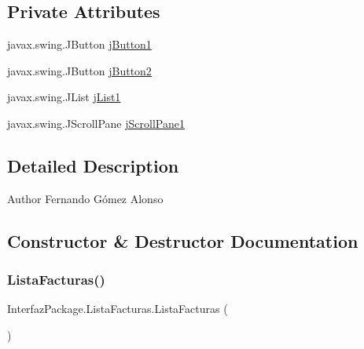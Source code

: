 \subsection*{Private Attributes}
\begin{DoxyCompactItemize}
\item 
javax.\+swing.\+J\+Button \mbox{\hyperlink{class_interfaz_package_1_1_lista_facturas_af1f1a335b42683dc72b7096d9c5612b5}{j\+Button1}}
\item 
javax.\+swing.\+J\+Button \mbox{\hyperlink{class_interfaz_package_1_1_lista_facturas_a099e7867e628d252ed807ea6bd95dea1}{j\+Button2}}
\item 
javax.\+swing.\+J\+List \mbox{\hyperlink{class_interfaz_package_1_1_lista_facturas_a92c3e7b820b65782c261920bbc6af073}{j\+List1}}
\item 
javax.\+swing.\+J\+Scroll\+Pane \mbox{\hyperlink{class_interfaz_package_1_1_lista_facturas_a3963a695019cd45a2b9559b6a31530ef}{j\+Scroll\+Pane1}}
\end{DoxyCompactItemize}


\subsection{Detailed Description}
\begin{DoxyAuthor}{Author}
Fernando Gómez Alonso 
\end{DoxyAuthor}


\subsection{Constructor \& Destructor Documentation}
\mbox{\label{class_interfaz_package_1_1_lista_facturas_a1e539cb0cbfd907b97944bdc34987938}} 
\subsubsection{\texorpdfstring{Lista\+Facturas()}{ListaFacturas()}}
{\footnotesize\ttfamily Interfaz\+Package.\+Lista\+Facturas.\+Lista\+Facturas (\begin{DoxyParamCaption}{ }\end{DoxyParamCaption})\hspace{0.3cm}{\ttfamily [inline]}}

